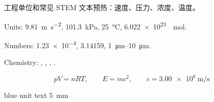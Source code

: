 


\begin{preview}

工程单位和常见 STEM 文本预热：速度、压力、浓度、温度。

Units:
\SI{9.81}{\meter\per\second\squared},
\SI{101.3}{\kilo\pascal},
\SI{25}{\degreeCelsius},
\SI{6.022e23}{\per\mole}.

Numbers:
\num{1.23e-4}, \num{3.14159}, \SIrange{1}{10}{\micro\meter}.

Chemistry:
, , , .

\[
  pV=nRT,\qquad
  E=mc^2,\qquad
  c=\SI{3.00e8}{\meter\per\second}
\]

{\color{blue}blue unit text}
{\color{red}\SI{5}{\milli\meter}}

\end{preview}

